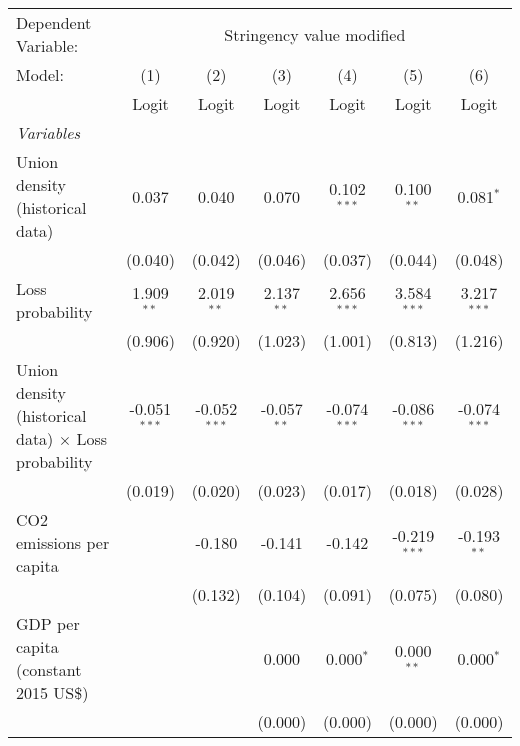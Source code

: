 
\begingroup
\centering
\begin{tabular}{lcccccc}
   \toprule
   Dependent Variable: & \multicolumn{6}{c}{Stringency value modified}\\
   Model:                                                     & (1)            & (2)            & (3)           & (4)            & (5)            & (6)\\  
                                                              &  Logit         & Logit          & Logit         & Logit          & Logit          & Logit\\  
   \midrule
   \emph{Variables}\\
   Union density (historical data)                            & 0.037          & 0.040          & 0.070         & 0.102$^{***}$  & 0.100$^{**}$   & 0.081$^{*}$\\   
                                                              & (0.040)        & (0.042)        & (0.046)       & (0.037)        & (0.044)        & (0.048)\\   
   Loss probability                                           & 1.909$^{**}$   & 2.019$^{**}$   & 2.137$^{**}$  & 2.656$^{***}$  & 3.584$^{***}$  & 3.217$^{***}$\\   
                                                              & (0.906)        & (0.920)        & (1.023)       & (1.001)        & (0.813)        & (1.216)\\   
   Union density (historical data) $\times$ Loss probability  & -0.051$^{***}$ & -0.052$^{***}$ & -0.057$^{**}$ & -0.074$^{***}$ & -0.086$^{***}$ & -0.074$^{***}$\\   
                                                              & (0.019)        & (0.020)        & (0.023)       & (0.017)        & (0.018)        & (0.028)\\   
   CO2 emissions per capita                                   &                & -0.180         & -0.141        & -0.142         & -0.219$^{***}$ & -0.193$^{**}$\\   
                                                              &                & (0.132)        & (0.104)       & (0.091)        & (0.075)        & (0.080)\\   
   GDP per capita (constant 2015 US\$)                        &                &                & 0.000         & 0.000$^{*}$    & 0.000$^{**}$   & 0.000$^{*}$\\   
                                                              &                &                & (0.000)       & (0.000)        & (0.000)        & (0.000)\\   

\end{tabular}

